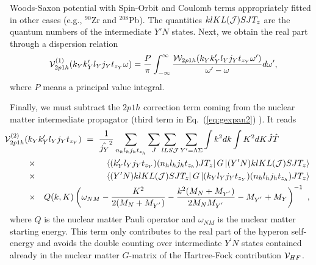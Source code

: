 Woods-Saxon potential with Spin-Orbit and Coulomb terms appropriately fitted
in other cases (e.g., $^{90}$Zr and $^{208}$Pb). The
quantities
$klKL({\cal J})SJT_z$ are the
quantum numbers of the intermediate $Y'N$ states. Next,
we obtain the real part through a 
dispersion relation
\begin{equation}
   {\cal V}^{(1)}_{2p1h}(k_{Y}k_{Y}'l_{Y}j_{Y}
   t_{z_{Y}} \omega)=
   \frac{P}{\pi} \int_{-\infty}^{\infty}
   \frac{{\cal W}_{2p1h}(k_{Y}k_{Y}'l_{Y}
    j_{Y}
    t_{z_{Y}} \omega')}{\omega'-\omega} d\omega',
    \label{eq:disprel}
\end{equation}
where $P$ means a principal value integral. 


Finally, we must subtract the $2p1h$  correction term 
coming from the nuclear matter intermediate propagator
(third term in Eq.\ (\ref{eq:gexpan2}) ). It reads
\begin{eqnarray}
\lefteqn{\hspace{-0.5cm}{\cal V}^{(2)}_{2p1h}(k_{Y}k_{Y}'l_{Y}   
      j_{Y}t_{z_{Y}}) \ = \
      {\displaystyle \frac{1}
      {\hat{j_{Y}}^2}\sum_{n_hl_hj_ht_{z_h}}
      \sum_{J}\sum_{lLS{\cal J}}\sum_{Y'=\Lambda\Sigma}\int k^{2}dk
      \int K^{2}dK\hat{J}\hat{T}}}\hspace{0.5cm}\nonumber \\
      &\times& \left\langle (k_{Y}'l_{Y}j_{Y} 
      t_{z_{Y}})(n_hl_hj_ht_{z_h})JT_z\right | 
      G\left | (Y'N)klKL({\cal J})SJT_z \right \rangle\nonumber \\
      &\times& \left\langle (Y'N)klKL({\cal J})SJT_z \right | G
      \left | (k_{Y}l_{Y}j_{Y}
      t_{z_{Y}})(n_hl_hj_ht_{z_h})JT_z \right \rangle \nonumber
      \\
      &\times& Q(k,K)\left(\omega_{NM} -\frac{K^2}{2(M_N+M_{Y^{'}})} -
      \frac{k^2(M_N+M_{Y^{'}})}{2M_NM_{Y^{'}}}-M_{Y^{'}}+M_Y\right)^{-1} \
,
   \label{eq:vc}
\end{eqnarray}
where $Q$ is the nuclear matter Pauli operator
and $\omega_{NM}$ is the nuclear matter starting
energy.
This term only contributes to the real part
of the hyperon self-energy and avoids the double counting over
intermediate $Y^\prime N$ states contained already in the nuclear
matter $G$-matrix of the Hartree-Fock contribution ${\cal V}_{HF}$.


